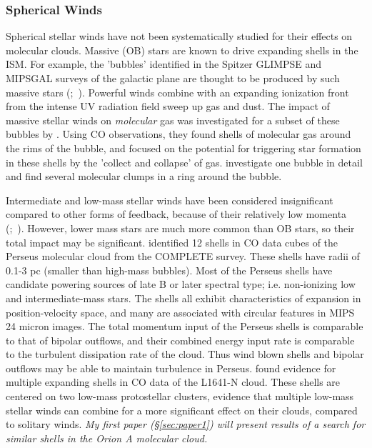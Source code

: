 \subsubsection{Spherical Winds}\label{sec:wind}
Spherical stellar winds have not been systematically studied for their effects on molecular clouds. Massive (OB) stars are known to drive expanding shells in the ISM. For example, the 'bubbles' identified in the Spitzer GLIMPSE and MIPSGAL surveys of the galactic plane are thought to be produced by such massive stars (\citet{Churchwell_2006};~\citet{Beaumont14}). Powerful winds combine with an expanding ionization front from the intense UV radiation field sweep up gas and dust. The impact of massive stellar winds on \textit{molecular} gas was investigated for a subset of these bubbles by \cite{Beaumont_2010}. Using CO observations, they found shells of molecular gas around the rims of the bubble, and focused on the potential for triggering star formation in these shells by the 'collect and collapse' of gas. \citet{Sidorin14} investigate one bubble in detail and find several molecular clumps in a ring around the bubble.

Intermediate and low-mass stellar winds have been considered insignificant compared to other forms of feedback, because of their relatively low momenta (\citet{Vink01};~\citet{Smith14a}). However, lower mass stars are much more common than OB stars, so their total impact may be significant. \cite{Arce_2011} identified 12 shells in CO data cubes of the Perseus molecular cloud from the COMPLETE survey. These shells have radii of 0.1-3 pc (smaller than high-mass bubbles). Most of the Perseus shells have candidate powering sources of late B or later spectral type; i.e. non-ionizing low and intermediate-mass stars. The shells all exhibit characteristics of expansion in position-velocity space, and many are associated with circular features in MIPS 24 micron images. The total momentum input of the Perseus shells is comparable to that of bipolar outflows, and their combined energy input rate is comparable to the turbulent dissipation rate of the cloud. Thus wind blown shells and bipolar outflows may be able to maintain turbulence in Perseus. \cite{Nakamura12} found evidence for multiple expanding shells in CO data of the L1641-N cloud. These shells are centered on two low-mass protostellar clusters, evidence that multiple low-mass stellar winds can combine for a more significant effect on their clouds, compared to solitary winds. \textit{My first paper (\S\ref{sec:paper1}) will present results of a search for similar shells in the Orion A molecular cloud.}
